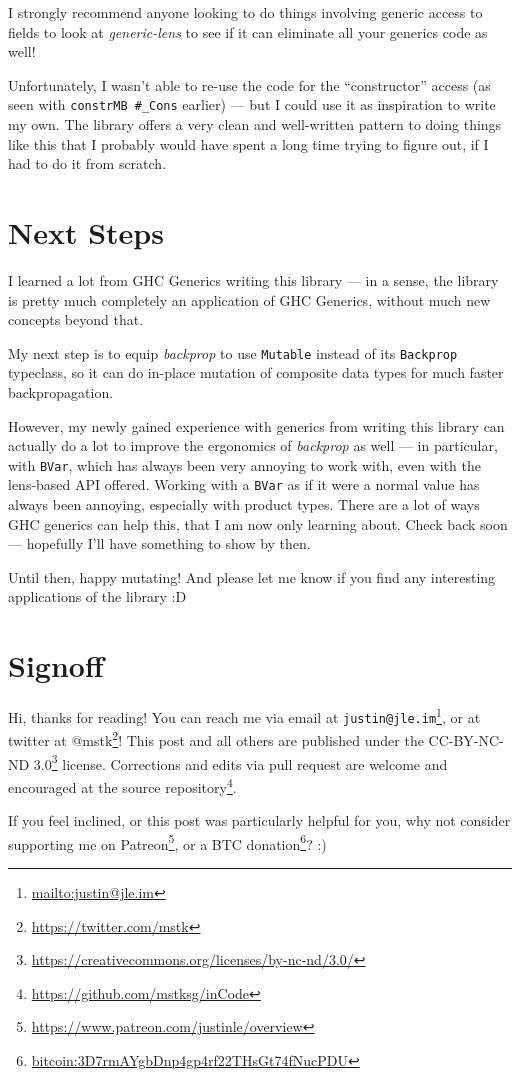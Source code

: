 \documentclass[]{article}
\renewcommand{\href}[2]{#2\footnote{\url{#1}}}
\begin{document}
I strongly recommend anyone looking to do things involving generic access to
fields to look at \emph{generic-lens} to see if it can eliminate all your
generics code as well!

Unfortunately, I wasn't able to re-use the code for the ``constructor'' access
(as seen with \texttt{constrMB\ \#\_Cons} earlier) --- but I could use it as
inspiration to write my own. The library offers a very clean and well-written
pattern to doing things like this that I probably would have spent a long time
trying to figure out, if I had to do it from scratch.

\hypertarget{next-steps}{%
\section{Next Steps}\label{next-steps}}

I learned a lot from GHC Generics writing this library --- in a sense, the
library is pretty much completely an application of GHC Generics, without much
new concepts beyond that.

My next step is to equip \emph{backprop} to use \texttt{Mutable} instead of its
\texttt{Backprop} typeclass, so it can do in-place mutation of composite data
types for much faster backpropagation.

However, my newly gained experience with generics from writing this library can
actually do a lot to improve the ergonomics of \emph{backprop} as well --- in
particular, with \texttt{BVar}, which has always been very annoying to work
with, even with the lens-based API offered. Working with a \texttt{BVar} as if
it were a normal value has always been annoying, especially with product types.
There are a lot of ways GHC generics can help this, that I am now only learning
about. Check back soon --- hopefully I'll have something to show by then.

Until then, happy mutating! And please let me know if you find any interesting
applications of the library :D

\hypertarget{signoff}{%
\section{Signoff}\label{signoff}}

Hi, thanks for reading! You can reach me via email at
\href{mailto:justin@jle.im}{\nolinkurl{justin@jle.im}}, or at twitter at
\href{https://twitter.com/mstk}{@mstk}! This post and all others are published
under the \href{https://creativecommons.org/licenses/by-nc-nd/3.0/}{CC-BY-NC-ND
3.0} license. Corrections and edits via pull request are welcome and encouraged
at \href{https://github.com/mstksg/inCode}{the source repository}.

If you feel inclined, or this post was particularly helpful for you, why not
consider \href{https://www.patreon.com/justinle/overview}{supporting me on
Patreon}, or a \href{bitcoin:3D7rmAYgbDnp4gp4rf22THsGt74fNucPDU}{BTC donation}?
:)
\end{document}
